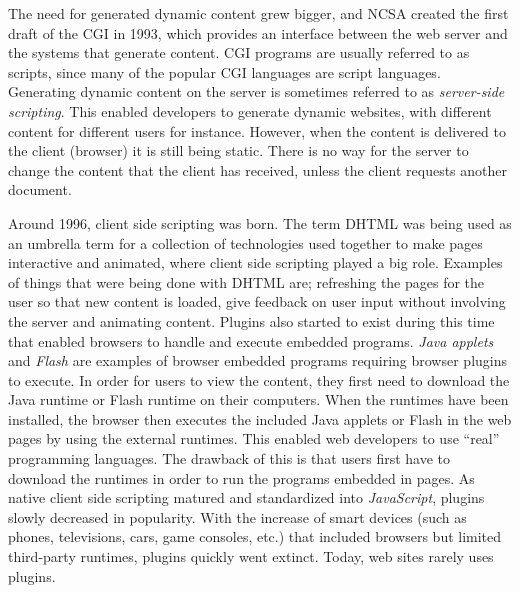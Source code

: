 \documentclass[a4paper,11pt]{kth-mag}
\begin{document}
        The need for generated dynamic content grew bigger, and \gls{NCSA} created the first draft of the \gls{CGI} in 1993, which provides an interface between the \gls{web} server and the systems that generate content.
        \gls{CGI} programs are usually referred to as scripts, since many of the popular \gls{CGI} languages are script languages.
        Generating dynamic content on the server is sometimes referred to as \emph{server-side scripting}.
        This enabled developers to generate dynamic websites, with different content for different users for instance.
        However, when the content is delivered to the client (\gls{browser}) it is still being static.
        There is no way for the server to change the content that the client has received, unless the client requests another document.

        Around 1996, client side scripting was born.
        The term \gls{DHTML} was being used as an umbrella term for a collection of technologies used together to make pages interactive and animated, where client side scripting played a big role.
        Examples of things that were being done with \gls{DHTML} are; refreshing the pages for the user so that new content is loaded, give feedback on user input without involving the server and animating content.
        Plugins also started to exist during this time that enabled \glspl{browser} to handle and execute embedded programs.
        \emph{\glspl{Java applet}} and \emph{\gls{Flash}} are examples of browser embedded programs requiring browser plugins to execute.
        In order for users to view the content, they first need to download the Java runtime or Flash runtime on their computers.
        When the runtimes have been installed, the \gls{browser} then executes the included Java applets or Flash in the \gls{web} pages by using the external runtimes.
        This enabled \gls{web} developers to use ``real'' programming languages.
        The drawback of this is that users first have to download the runtimes in order to run the programs embedded in pages.
        As native client side scripting matured and standardized into \emph{\gls{JavaScript}}, plugins slowly decreased in popularity.
        With the increase of smart devices (such as phones, televisions, cars, game consoles, etc.) that included \glspl{browser} but limited \gls{third-party} runtimes, plugins quickly went extinct.
        Today, \gls{web} sites rarely uses plugins.
\end{document}
